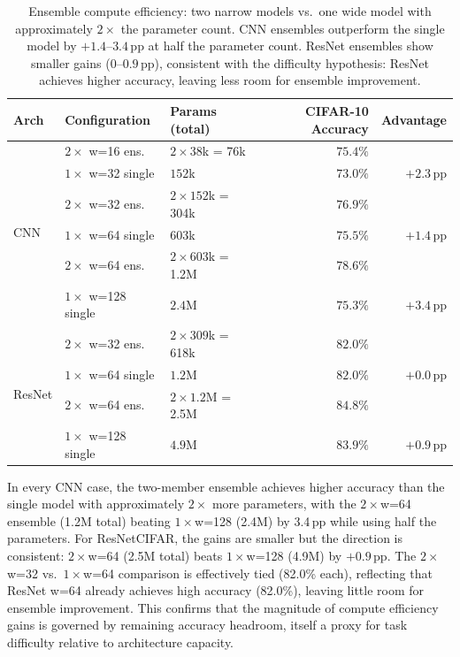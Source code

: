 \documentclass[11pt]{article}
\begin{document}
\begin{table}[h]
\centering
\small
\setlength{\tabcolsep}{5pt}
\begin{tabular}{lllrr}
\toprule
Arch & Configuration & Params (total) & CIFAR-10 Accuracy & Advantage\\
\midrule
\multirow{6}{*}{CNN}
 & $2\times$ w=16 ens. & $2\times 38$k = 76k  & $75.4\%$ & \\
 & $1\times$ w=32 single & $152$k              & $73.0\%$ & $+2.3$\,pp\\
\cmidrule{2-5}
 & $2\times$ w=32 ens. & $2\times152$k = 304k & $76.9\%$ & \\
 & $1\times$ w=64 single & $603$k              & $75.5\%$ & $+1.4$\,pp\\
\cmidrule{2-5}
 & $2\times$ w=64 ens. & $2\times603$k = 1.2M & $78.6\%$ & \\
 & $1\times$ w=128 single & $2.4$M             & $75.3\%$ & $+3.4$\,pp\\
\midrule
\multirow{4}{*}{ResNet}
 & $2\times$ w=32 ens. & $2\times309$k = 618k & $82.0\%$ & \\
 & $1\times$ w=64 single & $1.2$M              & $82.0\%$ & $+0.0$\,pp\\
\cmidrule{2-5}
 & $2\times$ w=64 ens. & $2\times1.2$M = 2.5M & $84.8\%$ & \\
 & $1\times$ w=128 single & $4.9$M             & $83.9\%$ & $+0.9$\,pp\\
\bottomrule
\end{tabular}
\caption{Ensemble compute efficiency: two narrow models vs.\ one wide model
with approximately $2\times$ the parameter count.  CNN ensembles outperform
the single model by $+1.4$--$3.4$\,pp at half the parameter count.
ResNet ensembles show smaller gains ($0$--$0.9$\,pp), consistent with the
difficulty hypothesis: ResNet achieves higher accuracy, leaving less room
for ensemble improvement.}
\label{tab:compute}
\end{table}

In every CNN case, the two-member ensemble achieves higher accuracy than the
single model with approximately $2\times$ more parameters, with the
$2{\times}$w=64 ensemble (1.2M total) beating $1{\times}$w=128 (2.4M) by
3.4\,pp while using half the parameters.  For ResNetCIFAR, the gains are
smaller but the direction is consistent: $2{\times}$w=64 (2.5M total)
beats $1{\times}$w=128 (4.9M) by $+0.9$\,pp.  The $2{\times}$w=32 vs.\
$1{\times}$w=64 comparison is effectively tied (82.0\% each), reflecting
that ResNet w=64 already achieves high accuracy (82.0\%), leaving little
room for ensemble improvement.  This confirms that the magnitude of compute
efficiency gains is governed by remaining accuracy headroom, itself a proxy
for task difficulty relative to architecture capacity.
\end{document}
